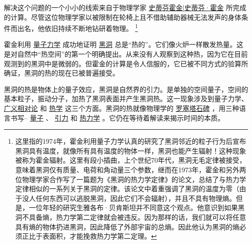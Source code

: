     解决这个问题的一个小小的线索来自于物理学家
\href{http://toyhouse.cc/wiki/index.php/史蒂芬霍金|史蒂芬·霍金}{史蒂芬霍金|史蒂芬·霍金}
所完成的计算。尽管这位物理学家以被限制在轮椅上且不借助辅助器械无法发声的身体条件而出名，他依旧持续不断地钻研着物理。
\footnote[6]
{
这里指的1974年，霍金利用量子力学认真的研究了黑洞邻近的粒子行为后宣布黑洞具有温度，就像所有具有温度的物体一样，黑洞也能产生辐射！这种现象被称为霍金辐射。这里有段小插曲，上个世纪70年代，黑洞无毛定律被接受，意味着黑洞仅有质量、电荷和角动量三个参数，继而在1973年，霍金和另外两位物理学家合作写了一篇题为《黑洞的热力学定律》的论文，总结了与热力学定律相似的一系列关于黑洞的定律。该论文中着重强调了黑洞的温度为零（由于没人任何东西可以逃脱黑洞，因此它们不会辐射），并且不具有物理熵。但是，一位年轻的研究生雅各布·贝肯斯坦并不同意这个观点。他意识到如果黑洞不具备熵，热力学第二定律就会被违反。因为那样的话，我们就可以将任意具有熵的物体扔进黑洞，因此降低了外部宇宙的总熵。因此他认为黑洞的熵必须正比于表面积，才能挽救热力学第二定理。
}
 
   霍金利用
\href{http://toyhouse.cc/wiki/index.php/量子力学}{量子力学}
成功地证明
\href{http://toyhouse.cc/wiki/index.php/黑洞}{黑洞}
总是“热的”。它们像火炉一样散发热量。这是对自然中“热空间”的第一个明确提出。从来没有人观察到这种热，因为它在目前观测到的黑洞中是微弱的。但霍金的计算是令人信服的，它已被不同方式的验算所确证，黑洞的热的现在已被普遍接受。

    黑洞的热是物体上的量子效应，黑洞是自然界的引力。是单独的空间量子，空间的基本粒子，振动分子，加热了黑洞表面并产生黑洞热。这一现象涉及到量子力学、
\href{http://toyhouse.cc/wiki/index.php/广义相对论}{广义相对论}
和
\href{http://toyhouse.cc/wiki/index.php/热学}{热学}
这三个方面。黑洞的热就像物理学的
\href{http://toyhouse.cc/wiki/index.php/罗塞塔石碑}{罗塞塔石碑}
，用三种语言书写–
\href{http://toyhouse.cc/wiki/index.php/量子}{量子}
、
\href{http://toyhouse.cc/wiki/index.php/引力}{引力}
和
\href{http://toyhouse.cc/wiki/index.php/热力学}{热力学}
。它仍在等待着解读来揭示时间的本质。

\noindent
